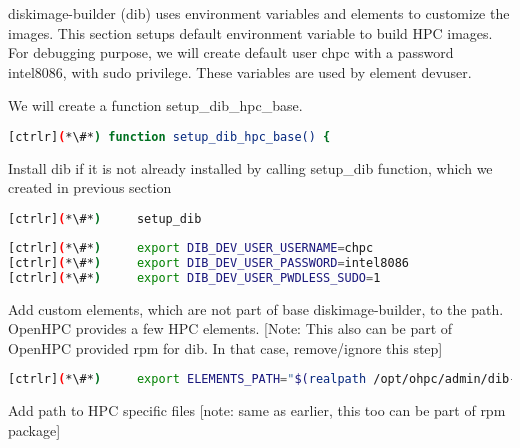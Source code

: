 
	diskimage-builder (dib) uses environment variables and elements to customize the images. This section setups default environment variable to build HPC images. For debugging purpose, we will create default user chpc with a password intel8086, with sudo privilege. These variables are used by element devuser. 

	We will create a function setup\_dib\_hpc\_base.

\begin{lstlisting}[language=bash,keywords={}]
[ctrlr](*\#*) function setup_dib_hpc_base() {
\end{lstlisting}

	Install dib if it is not already installed by calling setup\_dib function, which we created in previous section

\begin{lstlisting}[language=bash,keywords={}]
[ctrlr](*\#*)     setup_dib
\end{lstlisting}

\begin{lstlisting}[language=bash,keywords={}]
[ctrlr](*\#*)     export DIB_DEV_USER_USERNAME=chpc
[ctrlr](*\#*)     export DIB_DEV_USER_PASSWORD=intel8086
[ctrlr](*\#*)     export DIB_DEV_USER_PWDLESS_SUDO=1
\end{lstlisting}

	Add custom elements, which are not part of base diskimage-builder, to the path. OpenHPC provides a few HPC elements. [Note: This also can be part of OpenHPC provided rpm for dib. In that case, remove/ignore this step]

\begin{lstlisting}[language=bash,keywords={}]
[ctrlr](*\#*)     export ELEMENTS_PATH="$(realpath /opt/ohpc/admin/dib-chpc/elements/)"
\end{lstlisting}

	Add path to HPC specific files [note: same as earlier, this too can be part of rpm package]

